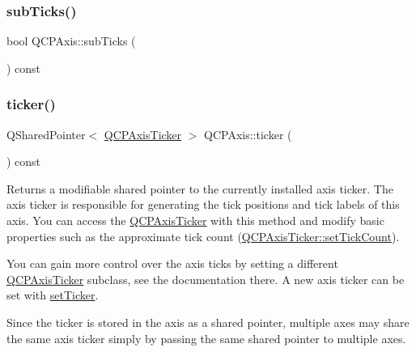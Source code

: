 \mbox{\label{class_q_c_p_axis_ad74153c38fd83b54c509cff249370beb}} 
\subsubsection{\texorpdfstring{subTicks()}{subTicks()}}
{\footnotesize\ttfamily bool Q\+C\+P\+Axis\+::sub\+Ticks (\begin{DoxyParamCaption}{ }\end{DoxyParamCaption}) const\hspace{0.3cm}{\ttfamily [inline]}}

\mbox{\label{class_q_c_p_axis_a7b7a27151be8235059e1294f73ecf615}} 
\subsubsection{\texorpdfstring{ticker()}{ticker()}}
{\footnotesize\ttfamily Q\+Shared\+Pointer$<$ \mbox{\hyperlink{class_q_c_p_axis_ticker}{Q\+C\+P\+Axis\+Ticker}} $>$ Q\+C\+P\+Axis\+::ticker (\begin{DoxyParamCaption}{ }\end{DoxyParamCaption}) const\hspace{0.3cm}{\ttfamily [inline]}}

Returns a modifiable shared pointer to the currently installed axis ticker. The axis ticker is responsible for generating the tick positions and tick labels of this axis. You can access the \mbox{\hyperlink{class_q_c_p_axis_ticker}{Q\+C\+P\+Axis\+Ticker}} with this method and modify basic properties such as the approximate tick count (\mbox{\hyperlink{class_q_c_p_axis_ticker_a47752abba8293e6dc18491501ae34008}{Q\+C\+P\+Axis\+Ticker\+::set\+Tick\+Count}}).

You can gain more control over the axis ticks by setting a different \mbox{\hyperlink{class_q_c_p_axis_ticker}{Q\+C\+P\+Axis\+Ticker}} subclass, see the documentation there. A new axis ticker can be set with \mbox{\hyperlink{class_q_c_p_axis_a4ee03fcd2c74d05cd1a419b9af5cfbdc}{set\+Ticker}}.

Since the ticker is stored in the axis as a shared pointer, multiple axes may share the same axis ticker simply by passing the same shared pointer to multiple axes.

